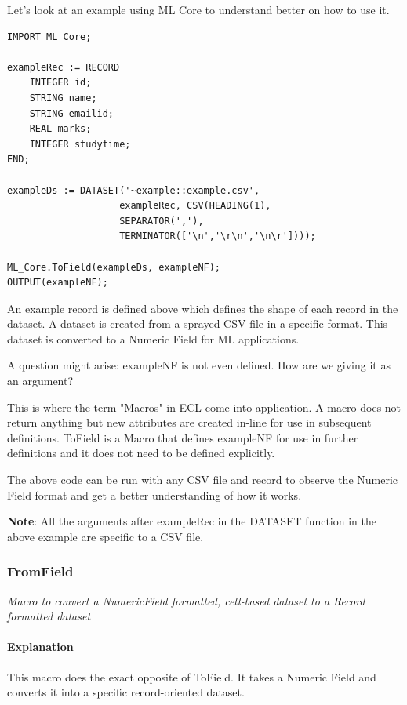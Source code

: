 Let's look at an example using ML Core to understand better on how to use it.

\begin{lstlisting}
IMPORT ML_Core;

exampleRec := RECORD
    INTEGER id;
    STRING name;
    STRING emailid;
    REAL marks;
    INTEGER studytime;
END;

exampleDs := DATASET('~example::example.csv', 
                    exampleRec, CSV(HEADING(1),
                    SEPARATOR(','),
                    TERMINATOR(['\n','\r\n','\n\r'])));

ML_Core.ToField(exampleDs, exampleNF);
OUTPUT(exampleNF);
\end{lstlisting}

An example record is defined above which defines the shape of each record in the dataset. A dataset is created from a sprayed CSV file in a specific format. This dataset is converted to a Numeric Field for ML applications.

A question might arise: exampleNF is not even defined. How are we giving it as an argument?

This is where the term "Macros" in ECL come into application. A macro does not return anything but new attributes are created in-line for use in subsequent definitions. ToField is a Macro that defines exampleNF for use in further definitions and it does not need to be defined explicitly.

The above code can be run with any CSV file and record to observe the Numeric Field format and get a better understanding of how it works.

\textbf{Note}: All the arguments after exampleRec in the DATASET function in the above example are specific to a CSV file.

\subsubsection{FromField}\label{mlcore:fromfield}

\textit{Macro to convert a NumericField formatted, cell-based dataset to a Record formatted dataset}

\paragraph{Explanation}

This macro does the exact opposite of ToField. It takes a Numeric Field and converts it into a specific record-oriented dataset. 

